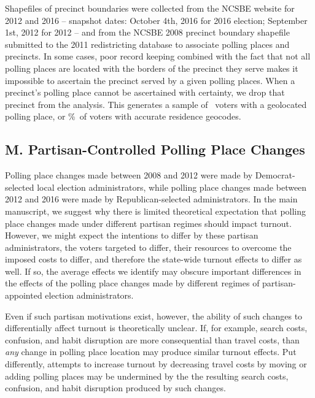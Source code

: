\documentclass{cup_PSRM}
\begin{document}
Shapefiles of precinct boundaries were collected from the NCSBE website for 2012 and 2016 -- snapshot dates: October 4th, 2016 for 2016 election; September 1st, 2012 for 2012 -- and from the NCSBE 2008 precinct boundary shapefile submitted to the 2011 redistricting database to associate polling places and precincts. In some cases, poor record keeping combined with the fact that not all polling places are located with the borders of the precinct they serve makes it impossible to ascertain the precinct served by a given polling places. When a precinct's polling place cannot be ascertained with certainty, we drop that precinct from the analysis. This generates a sample of \unskip~voters with a geolocated polling place, or \unskip\%~of voters with accurate residence geocodes.




\clearpage \newpage
\subsection{M. Partisan-Controlled Polling Place Changes}\label{appendix_partisan}
\setcounter{table}{0}
\setcounter{figure}{0}
\renewcommand{\thetable}{M\arabic{table}}
\renewcommand{\thefigure}{M\arabic{figure}}

\noindent Polling place changes made between 2008 and 2012 were made by Democrat-selected local election administrators, while polling place changes made between 2012 and 2016 were made by Republican-selected administrators.  In the main manuscript, we suggest why there is limited theoretical expectation that polling place changes made under different partisan regimes should impact turnout.  However, we might expect the intentions to differ by these partisan administrators, the voters targeted to differ, their resources to overcome the imposed costs to differ, and therefore the state-wide turnout effects to differ as well. If so, the average effects we identify may obscure important differences in the effects of the polling place changes made by different regimes of partisan-appointed election administrators.

Even if such partisan motivations exist, however, the ability of such changes to differentially affect turnout is theoretically unclear.  If, for example, search costs, confusion, and habit disruption are more consequential than travel costs, than \emph{any} change in polling place location may produce similar turnout effects.  Put differently, attempts to increase turnout by decreasing travel costs by moving or adding polling places may be undermined by the the resulting search costs, confusion, and habit disruption produced by such changes.
\end{document}
